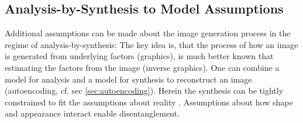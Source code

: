 	\subsection{Analysis-by-Synthesis to Model Assumptions}\label{sec:anabysyn}
		Additional assumptions can be made about the image generation process in the regime of analysis-by-synthesis:
		The key idea is, that the process of how an image is generated from underlying factors (graphics), is much better known that estimating the factors from the image (inverse graphics).
		One can combine a model for analysis and a model for synthesis to reconstruct an image (autoencoding, cf. sec \ref{sec:autoencoding}).
		Herein the synthesis can be tightly constrained to fit the assumptions about reality \cite{tieleman14thesis}.
		Assumptions about how shape and appearance interact enable disentanglement.

